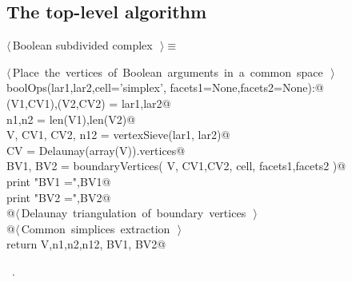 \documentclass[11pt,oneside]{article}	%
\begin{document}
\subsection{The top-level algorithm}
\begin{flushleft} \small \label{scrap2}
$\langle\,$Boolean subdivided complex\nobreak\ {\footnotesize {}}$\,\rangle\equiv$
\vspace{-1ex}
\begin{list}{}{} \item
\mbox{}\verb@@\hbox{$\langle\,$Place the vertices of Boolean arguments in a common space\nobreak\ {\footnotesize {}}$\,\rangle$}\verb@@\\
\mbox{}\verb@def boolOps(lar1,lar2,cell='simplex', facets1=None,facets2=None):@\\
\mbox{}\verb@   (V1,CV1),(V2,CV2) = lar1,lar2@\\
\mbox{}\verb@   n1,n2 = len(V1),len(V2)@\\
\mbox{}\verb@   V, CV1, CV2, n12 = vertexSieve(lar1, lar2)@\\
\mbox{}\verb@   CV = Delaunay(array(V)).vertices@\\
\mbox{}\verb@   BV1, BV2 = boundaryVertices( V, CV1,CV2, cell, facets1,facets2 )@\\
\mbox{}\verb@   print "\n BV1 =",BV1@\\
\mbox{}\verb@   print "\n BV2 =",BV2@\\
\mbox{}\verb@   @\hbox{$\langle\,$Delaunay triangulation of boundary vertices\nobreak\ {\footnotesize {}}$\,\rangle$}\verb@@\\
\mbox{}\verb@   @\hbox{$\langle\,$Common simplices extraction\nobreak\ {\footnotesize {}}$\,\rangle$}\verb@@\\
\mbox{}\verb@   return V,n1,n2,n12, BV1, BV2@\\
\mbox{}\verb@@{\NWsep}
\end{list}
\vspace{-1ex}
\footnotesize\addtolength{\baselineskip}{-1ex}
\begin{list}{}{\setlength{\itemsep}{-\parsep}\setlength{\itemindent}{-\leftmargin}}
\item \NWtxtMacroRefIn\ .
\end{list}
\end{flushleft}
\end{document}
